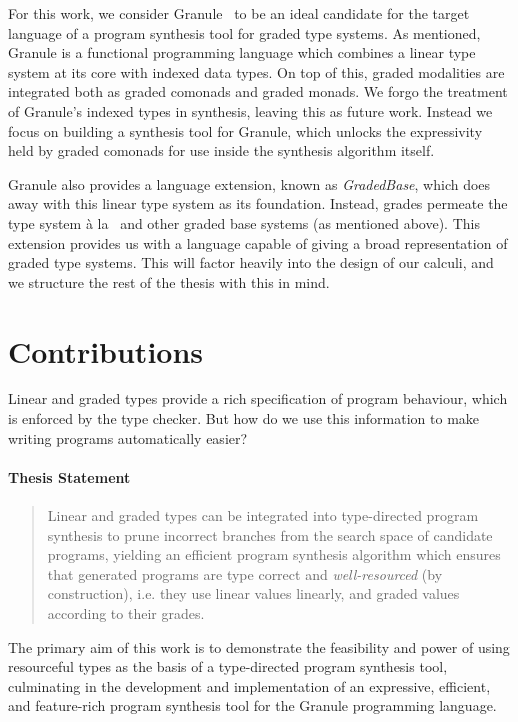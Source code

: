 For this work, we consider Granule~\citep{DBLP:journals/pacmpl/OrchardLE19} to
be an ideal candidate for the target language of a program synthesis tool for
graded type systems. As mentioned, Granule is a functional programming language
which combines a linear type system at its core with indexed data types. On top
of this, graded modalities are integrated both as graded comonads and graded
monads. We forgo the treatment of Granule's indexed types in synthesis, leaving
this as future work. Instead we focus on building a synthesis tool for Granule,
which unlocks the expressivity held by graded comonads for use inside the
synthesis algorithm itself.

Granule also provides a language extension, known as \emph{GradedBase}, which
does away with this linear type system as its foundation. Instead, grades
permeate the type system à la~\citet{petricek2014coeffects} and other graded
base systems (as mentioned above). This extension provides us with a language capable of giving a
broad representation of graded type systems. This will factor heavily into the
design of our calculi, and we structure the rest of the thesis with this in
mind.

\section{Contributions}
Linear and graded types provide a rich specification of program behaviour, which
is enforced by the type checker. But how do we use this
information to make writing programs automatically easier?  

\paragraph{Thesis Statement} 
\label{para:thesis-statement}
\begin{quote}
      Linear and graded
types can be integrated into type-directed program synthesis to prune incorrect
branches from the search space of candidate programs, yielding an efficient
program synthesis algorithm which ensures that generated programs are type
correct and \emph{well-resourced} (by construction), i.e. they use linear values linearly, and
graded values according to their grades.
\end{quote}
 
The primary aim of this work is to demonstrate the feasibility and power of
using resourceful types as the basis of a type-directed program synthesis tool,
culminating in the development and implementation of an expressive, efficient,
and feature-rich program synthesis tool for the Granule programming language. 

